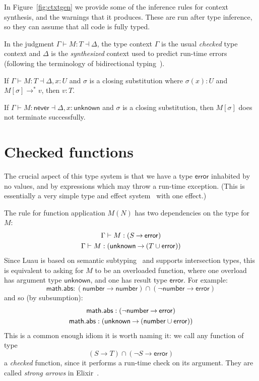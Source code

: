 \documentclass[sigplan]{acmart}
\newcommand{\NEVER}{\mathsf{never}}
\newcommand{\ERROR}{\mathsf{error}}
\newcommand{\UNKNOWN}{\mathsf{unknown}}
\newcommand{\NUMBER}{\mathsf{number}}
\newcommand{\MATH}{\mathsf{math}}
\newcommand{\ABS}{\mathsf{abs}}
\newcommand{\fun}{\mathbin{\rightarrow}}
\begin{document}
In Figure~\ref{fig:ctxtgen} we provide some of the inference rules for
context synthesis, and the warnings that it
produces.  These are run after type inference, so they can assume that
all code is fully typed.

In the judgment $\Gamma \vdash M : T \dashv
\Delta$, the type context $\Gamma$ is the usual \emph{checked} type
context and $\Delta$ is the \emph{synthesized} context used to predict
run-time errors (following the terminology of bidirectional
typing~\cite{BidirectionalTyping}).

\begin{conjecture}\label{conj:complete}%
If $\Gamma \vdash M : T \dashv \Delta, x:U$ and $\sigma$ is a closing
substitution where $\sigma(x) : U$ and $M[\sigma] \rightarrow^* v$,
then $v : T$.
\end{conjecture}

\begin{corollary}\label{cor:complete}%
If $\Gamma \vdash M : \NEVER \dashv \Delta, x:\UNKNOWN$ and $\sigma$ is a closing
substitution, then $M[\sigma]$ does not terminate successfully.
\end{corollary}

\section{Checked functions}

The crucial aspect of this type system is that we have a type $\ERROR$
inhabited by no values, and by expressions which may throw a run-time exception.
(This is essentially a very simple type and effect system~\cite{Nielson1999}
with one effect.)

The rule for function application $M(N)$
has two dependencies on the type for $M$:
\[\begin{array}{c}
  \Gamma \vdash M : (S \fun \ERROR)
  \\[\jot]
  \Gamma \vdash M : (\UNKNOWN \fun (T \cup \ERROR))
\end{array}\]
Since Luau is based on semantic subtyping~\cite{GF05:GentleIntroduction,Jef22:SemanticSubtyping} and supports
intersection types, this is equivalent to asking for $M$ to be an
overloaded function, where one overload has argument type $\UNKNOWN$, and
one has result type $\ERROR$. For example:
\[
  \MATH.\ABS : (\NUMBER \fun \NUMBER) \cap (\neg\NUMBER \fun \ERROR)
\]
and so (by subsumption):
\[\begin{array}{c}
  \MATH.\ABS : (\neg\NUMBER \fun \ERROR)
  \\[\jot]
  \MATH.\ABS : (\UNKNOWN \fun (\NUMBER \cup \ERROR))
\end{array}\]
This is a common enough idiom it is worth naming it:
we call any function of type 
\[
  (S \fun T) \cap (\neg S \fun \ERROR)
\]
a \emph{checked} function, since it performs a run-time check
on its argument. They are called \emph{strong arrows}
in Elixir~\cite{DesignElixir}.
\end{document}
